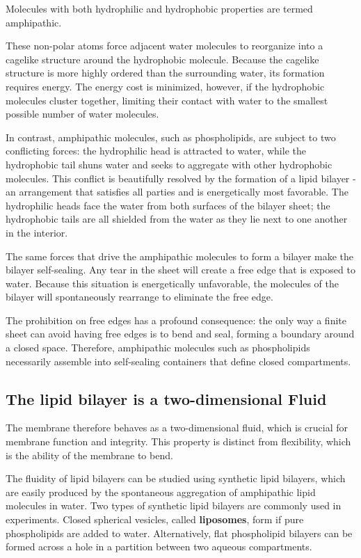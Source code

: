 Molecules with both hydrophilic and hydrophobic properties are termed
amphipathic.

These non-polar atoms force adjacent water molecules to reorganize into a cagelike
structure around the hydrophobic molecule. Because the
cagelike structure is more highly ordered than the surrounding water,
its formation requires energy. The energy cost is minimized, however, if
the hydrophobic molecules cluster together, limiting their contact with
water to the smallest possible number of water molecules.

In contrast, amphipathic molecules, such as phospholipids, are subject to two conflicting forces: the hydrophilic head is
attracted to water, while the hydrophobic tail shuns water and seeks to
aggregate with other hydrophobic molecules. This conflict is beautifully
resolved by the formation of a lipid bilayer - an arrangement that satisfies
all parties and is energetically most favorable. The hydrophilic heads
face the water from both surfaces of the bilayer sheet; the hydrophobic
tails are all shielded from the water as they lie next to one another in the
interior.

The same forces that drive the amphipathic molecules to form a bilayer
make the bilayer self-sealing. Any tear in the sheet will create a free edge
that is exposed to water. Because this situation is energetically unfavorable,
the molecules of the bilayer will spontaneously rearrange to eliminate
the free edge.

The prohibition on free edges has a profound consequence: the only way
a finite sheet can avoid having free edges is to bend and seal, forming a
boundary around a closed space. Therefore, amphipathic
molecules such as phospholipids necessarily assemble into self-sealing
containers that define closed compartments.

\subsection{The lipid bilayer is a two-dimensional Fluid}

The membrane therefore behaves as a two-dimensional fluid, which is crucial for membrane function and integrity.
This property is distinct from flexibility, which is the ability of
the membrane to bend.

The fluidity of lipid bilayers can be studied using synthetic lipid bilayers,
which are easily produced by the spontaneous aggregation of amphipathic
lipid molecules in water. Two types of synthetic lipid bilayers are
commonly used in experiments. Closed spherical vesicles, called \textbf{liposomes},
form if pure phospholipids are added to water. Alternatively, flat
phospholipid bilayers can be formed across a hole in a partition between
two aqueous compartments.

